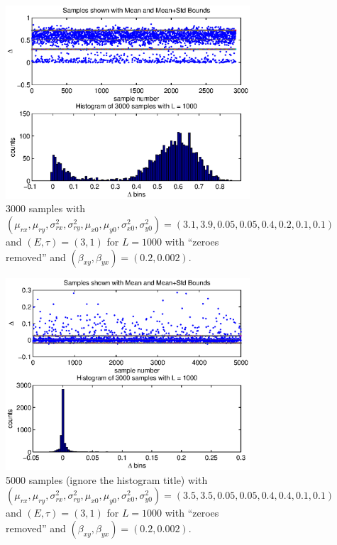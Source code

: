 \documentclass[a4paper,11pt]{article}
\begin{document}
\begin{figure}[h!t]
\centering
\centering
\begin{subfigure}[b]{0.4\textwidth}
\label{fig:TwoPopDynSampFig2}
\includegraphics[scale=0.55]{TwoPopDynSampFig2.eps}
\caption{3000 samples with $\left(\mu_{rx},\mu_{ry},\sigma^2_{rx},\sigma^2_{ry},\mu_{x0},\mu_{y0},\sigma^2_{x0},\sigma^2_{y0}\right) = \left(3.1,3.9,0.05,0.05,0.4,0.2,0.1,0.1\right)$ and $\left(E,\tau\right)=\left(3,1\right)$ for $L=1000$ with ``zeroes removed'' and $(\beta_{xy},\beta_{yx})=(0.2,0.002)$.}
\end{subfigure}
\begin{subfigure}[b]{0.4\textwidth}
\label{fig:TwoPopDynSampFig3}
\includegraphics[scale=0.55]{TwoPopDynSampFig3.eps}
\caption{5000 samples (ignore the histogram title) with $\left(\mu_{rx},\mu_{ry},\sigma^2_{rx},\sigma^2_{ry},\mu_{x0},\mu_{y0},\sigma^2_{x0},\sigma^2_{y0}\right) = \left(3.5,3.5,0.05,0.05,0.4,0.4,0.1,0.1\right)$ and $\left(E,\tau\right)=\left(3,1\right)$ for $L=1000$ with ``zeroes removed'' and $(\beta_{xy},\beta_{yx})=(0.2,0.002)$.}
\end{subfigure}
\caption{}
\end{figure}
\end{document}
